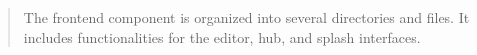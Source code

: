 





\begin{quote}
  The frontend component is organized into several directories and files. It includes functionalities for the editor, hub, and splash interfaces.
  \end{quote}




